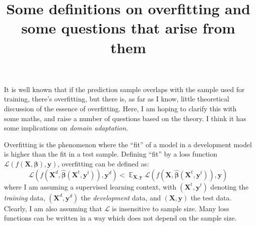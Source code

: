 \documentclass[12pt]{article}
\title{Some definitions on overfitting and some questions that arise from them}
\date{\vspace{-5ex}}
\DeclareMathOperator{\E}{\mathbb{E}}
\begin{document}
	\maketitle
	It is well known that if the prediction sample overlaps with the sample used for training, there's overfitting, but there is, as far as I know, little theoretical discussion of the essence of overfitting. Here, I am hoping to clarify this with some maths, and raise a number of questions based on the theory. I think it has some implications on \emph{domain adaptation}. 
	
	Overfitting is the phenomenon where the ``fit'' of a model in a development model is higher than the fit in a test sample. Defining ``fit'' by a loss function $\mathcal{L}(f(\boldsymbol{X}, \boldsymbol{\beta}), \boldsymbol{y})$, overfitting can be defined as: 
	\begin{equation}
		\mathcal{L}(f(\boldsymbol{X}^d, \hat{\boldsymbol{\beta}}(\boldsymbol{X}^t, \boldsymbol{y}^t)), \boldsymbol{y}^d) < \E_{\boldsymbol{X}, \boldsymbol{y}} \mathcal{L} (f(\boldsymbol{X}, \hat{\boldsymbol{\beta}}(\boldsymbol{X}^t, \boldsymbol{y}^t)), \boldsymbol{y})
	\end{equation}
	where I am assuming a supervised learning context, with $(\boldsymbol{X}^t, \boldsymbol{y}^t)$ denoting the \emph{training} data, $(\boldsymbol{X}^d, \boldsymbol{y}^d)$ the \emph{development} data, and $(\boldsymbol{X}, \boldsymbol{y})$ the test data. Clearly, I am also assuming that $\mathcal{L}$ is insensitive to sample size. Many loss functions can be written in a way which does not depend on the sample size. 
	
\end{document}
